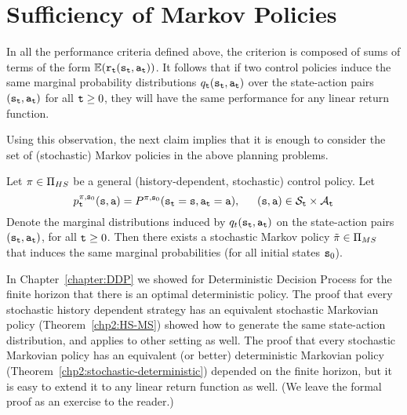 \section{Sufficiency of Markov Policies}
In all the performance criteria defined above, the criterion is
composed of sums of terms of the form
$\mathbb{E}({{\tt r}_{\tt t}}({{\tt s}_{\tt t}},{{\tt a}_{\tt t}}))$. It follows
that if two control policies induce the same marginal probability
distributions ${q_{\tt t}}({{\tt s}_{\tt t}},{{\tt a}_{\tt t}})$ over
the state-action pairs $({{\tt s}_{\tt t}},{{\tt a}_{\tt t}})$ for all
${\tt t} \ge 0$, they will have the same performance for any linear
return function.

Using this observation, the next claim implies that it is enough to
consider the set of (stochastic) Markov policies in the above
planning problems.

\begin{proposition}\label{prop:sufficient} Let  $\pi  \in {\Pi _{HS}}$ be a general (history-dependent, stochastic) control policy.  Let
\[p_{\tt t}^{\pi ,{{\tt s}_0}}({\tt s},{\tt a}) = {P^{\pi ,{{\tt s}_0}}}({{\tt s}_{\tt t}} = {\tt s},{{\tt a}_{\tt t}} = {\tt a}),\quad \;\;({\tt s},{\tt a}) \in {\mathcal{S}_{\tt t}} \times {\mathcal{A}_{\tt t}}\]
Denote the marginal distributions induced by
$q_t({{\tt s}_{\tt t}},{{\tt a}_{\tt t}})$ on the state-action pairs
$({{\tt s}_{\tt t}},{{\tt a}_{\tt t}})$, for all ${\tt t} \ge 0$. Then there
exists a stochastic Markov policy $\tilde {\pi} \in {\Pi_{MS}}$
that induces the same marginal probabilities (for all initial states
${{\tt s}_0}$).
\end{proposition}


In Chapter~\ref{chapter:DDP}  we showed for Deterministic Decision
Process for the finite horizon that there is an optimal
deterministic policy. The proof that every stochastic history
dependent strategy has an equivalent stochastic Markovian policy
(Theorem~\ref{chp2:HS-MS}) showed how to generate the same
state-action distribution, and applies to other setting as well. The
proof that every stochastic Markovian policy has an equivalent (or better) deterministic
Markovian policy (Theorem~\ref{chp2:stochastic-deterministic})
depended on the finite horizon, but it is easy to extend it to any
linear return function as well. (We leave the formal proof as an exercise to the reader.)  

